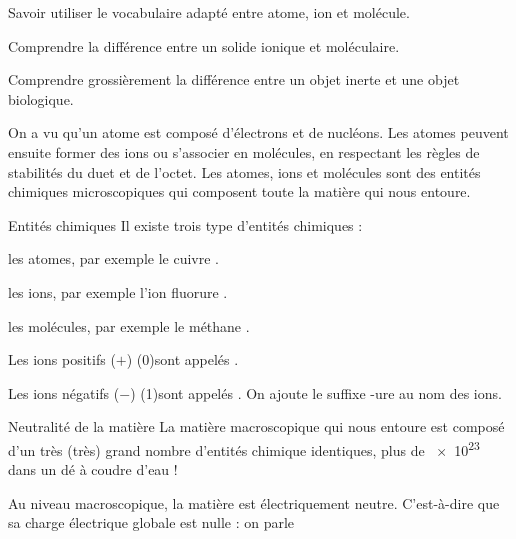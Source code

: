 \teteSndMole
\vspace*{-32pt}

\begin{objectifs}
  \item Savoir utiliser le vocabulaire adapté entre atome, ion et molécule.
  \item Comprendre la différence entre un solide ionique et moléculaire.
  \item Comprendre grossièrement la différence entre un objet inerte et une objet biologique.
\end{objectifs}

\begin{contexte}
  On a vu qu'un atome est composé d'électrons et de nucléons.
  Les atomes peuvent ensuite former des ions ou s'associer en molécules, en respectant les règles de stabilités du duet et de l'octet.
  Les atomes, ions et molécules sont des entités chimiques microscopiques qui composent toute la matière qui nous entoure.

\end{contexte}


\begin{doc}{Entités chimiques}
  Il existe trois type d'entités chimiques :
  \begin{listePoints}
    \item les atomes, par exemple le cuivre .
    \item les ions, par exemple l'ion fluorure .
    \item les molécules, par exemple le méthane .
  \end{listePoints}
  
  \begin{importants}
    Les ions positifs ($+$) \texteTrou(0){sont appelés .}
    
    Les ions négatifs ($-$) \texteTrou(1){sont appelés . On ajoute le suffixe -ure au nom des ions.}
  \end{importants}
\end{doc}

\begin{doc}{Neutralité de la matière}
  La matière macroscopique qui nous entoure est composé d'un très (très) grand nombre d'entités chimique identiques, plus de \num{e23} dans un dé à coudre d'eau !
  
  \begin{importants}
    Au niveau macroscopique, la matière est électriquement neutre.
    C'est-à-dire que sa charge électrique globale est nulle : on parle 
  \end{importants}
\end{doc}

